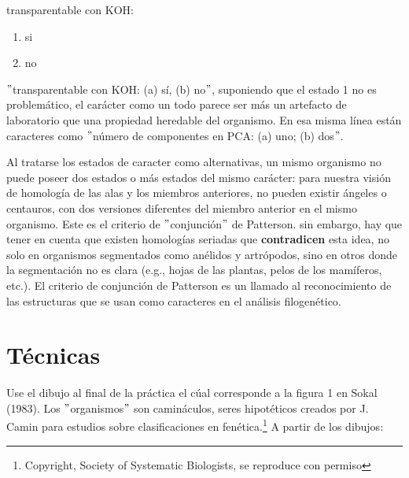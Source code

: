 \begin{small}
transparentable con KOH: 
	\begin{enumerate}[start=0]
		\item si
		\item no
	\end{enumerate}	
\end{small}

$"$transparentable con KOH: (a) s\'i, (b) no$"$, suponiendo que el estado 1 no es problem\'atico, el car\'acter como un todo parece ser m\'as un artefacto de laboratorio que una propiedad heredable del organismo. En esa misma l\'inea est\'an caracteres como $"$n\'umero de componentes en PCA: (a) uno; (b) dos$"$.

Al tratarse los estados de caracter como alternativas, un mismo organismo no puede poseer dos estados o m\'as estados del mismo car\'acter: para nuestra visi\'on de homolog\'ia de las alas y los miembros anteriores, no pueden existir \'angeles o centauros, con dos versiones diferentes del miembro anterior en el mismo organismo. Este es el criterio de $"$conjunci\'on$"$ de Patterson. sin embargo, hay que tener en cuenta que existen homolog\'ias seriadas que \textbf{contradicen} esta idea, no solo en organismos segmentados como an\'elidos y artr\'opodos, sino en otros donde la segmentaci\'on no es clara (e.g., hojas de las plantas, pelos de los mam\'iferos, etc.). El criterio de conjunci\'on de Patterson es un llamado al reconocimiento de las estructuras que se usan como caracteres en el an\'alisis filogen\'etico.


\section*{T\'ecnicas}


Use el dibujo al final de la pr\'actica el c\'ual corresponde a la figura 1 en Sokal (1983). 
Los $"$organismos$"$ son camin\'aculos, seres hipot\'eticos creados por J. Camin para estudios sobre clasificaciones en fen\'etica.\footnote{Copyright, Society of Systematic Biologists, se reproduce con permiso} A partir de los dibujos:



